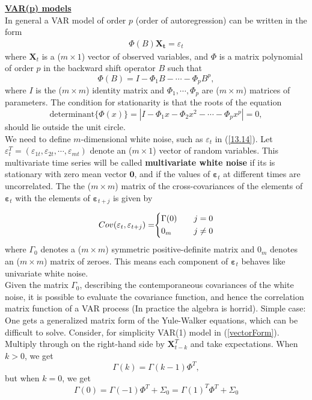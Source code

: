 \noindent
\textbf{\underline{VAR(p) models}}\\

In general a VAR model of order $p$ (order of autoregression) can be written in the form \begin{align}
    \Phi(B) \mathbf{X_t} = \varepsilon_t \label{13.14}
\end{align} where $\mathbf{X}_t$ is a ($m\times 1$) vector of observed variables, and $\Phi$ is a matrix polynomial of order $p$ in the backward shift operator $B$ such that \[
\Phi(B)=I- \Phi_1 B- \cdots - \Phi_p B^p,
\] where $I$ is the ($m\times m$) identity matrix and $\Phi_1, \cdots, \Phi_p$ are ($m\times m$) matrices of parameters. The condition for stationarity is that the roots of the equation \[
\text{determinant}\{\Phi(x)\} = |I-\Phi_1x - \Phi_2 x^2 - \cdots - \Phi_px^p|=0,
\] should lie outside the unit circle.\\

We need to define $m$-dimensional white noise, such as $\varepsilon_t$ in (\ref{13.14}). Let $\varepsilon_t^T=(\varepsilon_{1t},\varepsilon_{2t},\cdots,\varepsilon_{mt})$ denote an ($m \times 1$) vector of random variables. This multivariate time series will be called \textbf{multivariate white noise} if its is stationary with zero mean vector $\mathbf{0}$, and if the values of $\mathbf{\varepsilon}_t$ at different times are uncorrelated. The the ($m\times m$) matrix of the cross-covariances of the elements of $\mathbf{\varepsilon}_t$ with the elements of $\mathbf{\varepsilon}_{t+j}$ is given by 

\begin{subequations}
\begin{equation}
\begin{array}{r@{}l}
Cov(\mathbf{\varepsilon}_t, \mathbf{\varepsilon}_{t+j}) = & \left\{
\begin{aligned}
    &\Gamma(0) & \quad & j=0 \nonumber \\
    &0_m & \quad & j \neq 0 \nonumber
\end{aligned}
\right.
\end{array}
\end{equation}
\end{subequations}
where $\Gamma_0$ denotes a ($m\times m$) symmetric positive-definite matrix and $0_m$ denotes an ($m \times m$) matrix of zeroes. This means each component of $\mathbf{\varepsilon}_t$ behaves like univariate white noise.\\

Given the matrix $\Gamma_0$, describing the contemporaneous covariances of the white noise, it is possible to evaluate the covariance function, and hence the correlation matrix function of a VAR process (In practice the algebra is horrid). Simple case: One gets a generalized matrix form of the Yule-Walker equations, which can be difficult to solve. Consider, for simplicity VAR(1) model in (\ref{vectorForm}). Multiply through on the right-hand side by $\mathbf{X}_{t-k}^T$ and take expectations. When $k>0$, we get \[
\Gamma(k)=\Gamma(k-1) \Phi^T,
\] but when $k=0$, we get \[
\Gamma(0) =\Gamma(-1)\Phi^T + \Sigma_0 =\Gamma(1)^T \Phi^T + \Sigma_0
\]

